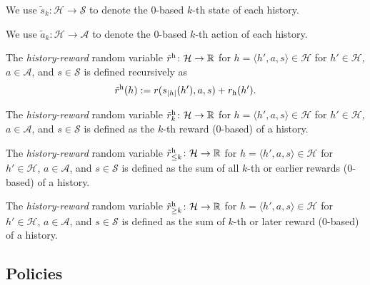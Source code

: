 \begin{definition}
  We use $\tilde{s}_k\colon \mathcal{H} \to \mathcal{S}$ to denote the 0-based $k$-th state of each history.
  \leanok
\end{definition}

\begin{definition}
  We use $\tilde{a}_k\colon \mathcal{H} \to \mathcal{A}$ to denote the 0-based $k$-th action of each history.
  \leanok
\end{definition}

\begin{definition} \label{def:reward}
The \emph{history-reward} random variable $\tilde{r}^{\mathrm{h}}\colon \mathcal{H} \to \mathbb{R}$ for $h = \langle h', a, s \rangle \in  \mathcal{H}$ for $h'\in \mathcal{H}$, $a\in \mathcal{A}$, and $s\in \mathcal{S}$ is defined recursively as
\[
\tilde{r}^{\mathrm{h}}(h) := r(s_{|h|}(h'), a, s) + r_{\mathrm{h}}(h').
\]
 \leanok
\end{definition}

\begin{definition}\label{reward_at}
The \emph{history-reward} random variable $\tilde{r}^{\mathrm{h}}_k \colon \mathcal{H} \to \mathbb{R}$ for $h = \langle h', a, s \rangle \in  \mathcal{H}$ for $h'\in \mathcal{H}$, $a\in \mathcal{A}$, and $s\in \mathcal{S}$ is defined as the $k$-th reward (0-based) of a history.
 \leanok
\end{definition}

\begin{definition}\label{reward_to}
The \emph{history-reward} random variable $\tilde{r}^{\mathrm{h}}_{\le k} \colon \mathcal{H} \to \mathbb{R}$ for $h = \langle h', a, s \rangle \in  \mathcal{H}$ for $h'\in \mathcal{H}$, $a\in \mathcal{A}$, and $s\in \mathcal{S}$ is defined as the sum of all $k$-th or earlier rewards (0-based) of a history.
 \leanok
\end{definition}

\begin{definition}\label{reward_from}
The \emph{history-reward} random variable $\tilde{r}^{\mathrm{h}}_{\ge k}\colon \mathcal{H} \to \mathbb{R}$ for $h = \langle h', a, s \rangle \in  \mathcal{H}$ for $h'\in \mathcal{H}$, $a\in \mathcal{A}$, and $s\in \mathcal{S}$ is defined as the sum of $k$-th or later reward (0-based) of a history.
 \leanok
\end{definition}

\subsection{Policies}


